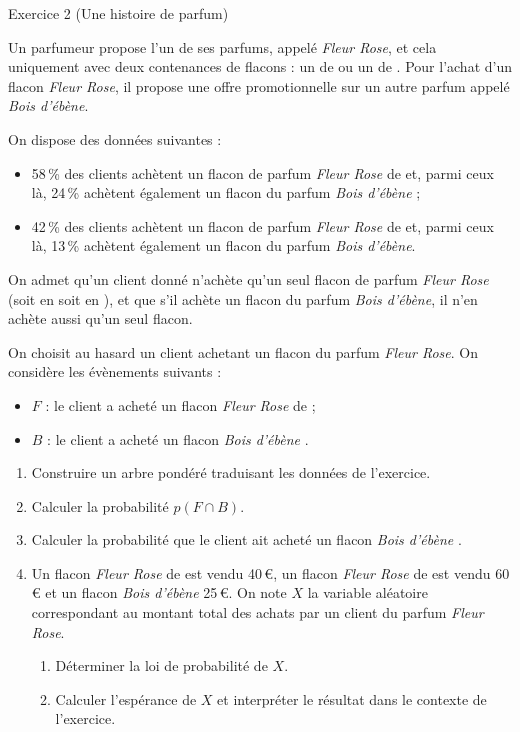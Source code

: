 \documentclass[a4paper,11pt]{article}
\begin{document}
\medskip

\begin{blocexo}Exercice 2 \dotfill{}(Une histoire de parfum)\end{blocexo}

\smallskip

Un parfumeur propose l’un de ses parfums, appelé \textit{Fleur Rose}, et cela uniquement avec deux contenances de flacons : un de   ou un de . Pour l'achat d'un flacon \textit{Fleur Rose}, il propose une offre promotionnelle sur un autre parfum appelé \textit{Bois d’ébène}.

\smallskip

On dispose des données suivantes :

\begin{itemize}
	\item 58\,\% des clients achètent un flacon de parfum \textit{Fleur Rose} de  et, parmi ceux là, 24\,\% achètent également un flacon du parfum \textit{Bois d’ébène} ;
	\item 42\,\% des clients achètent un flacon de parfum \textit{Fleur Rose} de   et, parmi ceux là,
	13\,\% achètent également un flacon du parfum \textit{Bois d’ébène}.
\end{itemize}

On admet qu’un client donné n’achète qu’un seul flacon de parfum \textit{Fleur Rose} (soit en  soit en ), et que s’il achète un flacon du parfum \textit{Bois d’ébène}, il n’en achète aussi qu’un seul flacon.

On choisit au hasard un client achetant un flacon du parfum \textit{Fleur Rose}. On considère les évènements suivants :

\begin{itemize}
	\item $F$ : \og le client a acheté un flacon \textit{Fleur Rose} de  \fg ;
	\item $B$ : \og le client a acheté un flacon \textit{Bois d’ébène} \fg.
\end{itemize}

\begin{enumerate}
	\item Construire un arbre pondéré traduisant les données de l’exercice.
	\item Calculer la probabilité $p(F \cap B)$.
	\item Calculer la probabilité que le client ait acheté un flacon \textit{Bois d’ébène} .
	\item Un flacon \textit{Fleur Rose} de  est vendu 40\,€, un flacon \textit{Fleur Rose} de  est vendu 60\,€ et un flacon \textit{Bois d’ébène} 25\,€. On note $X$ la variable aléatoire correspondant au montant total des achats par un client du parfum \textit{Fleur Rose}.
	\begin{enumerate}
		\item  Déterminer la loi de probabilité de $X$.
		\item Calculer l’espérance de $X$ et interpréter le résultat dans le contexte de l’exercice.
	\end{enumerate}
\end{enumerate}
\end{document}
